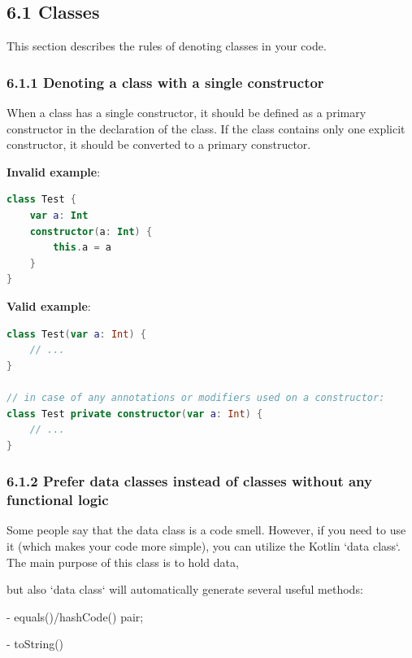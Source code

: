 {{{{\subsection*{\textbf{6.1 Classes}}

This section describes the rules of denoting classes in your code.

\subsubsection*{\textbf{6.1.1  Denoting a class with a single constructor}}
\leavevmode\newline

When a class has a single constructor, it should be defined as a primary constructor in the declaration of the class. If the class contains only one explicit constructor, it should be converted to a primary constructor.



\textbf{Invalid example}:

\begin{lstlisting}[language=Kotlin]
class Test {
    var a: Int
    constructor(a: Int) {
        this.a = a
    }
}
\end{lstlisting}


\textbf{Valid example}:

\begin{lstlisting}[language=Kotlin]
class Test(var a: Int) { 
    // ...
}

// in case of any annotations or modifiers used on a constructor:
class Test private constructor(var a: Int) { 
    // ...
}
\end{lstlisting}


\subsubsection*{\textbf{6.1.2 Prefer data classes instead of classes without any functional logic}}
\leavevmode\newline

Some people say that the data class is a code smell. However, if you need to use it (which makes your code more simple), you can utilize the Kotlin `data class`. The main purpose of this class is to hold data,

but also `data class` will automatically generate several useful methods:

- equals()/hashCode() pair;

- toString()

}}}}
